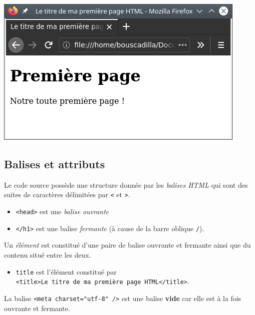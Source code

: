 \documentclass[a4paper,17pt]{extarticle}
\makeatletter
\let\origfigure\figure
\let\endorigfigure\endfigure
\renewenvironment{figure}[1][2] {
    \expandafter\origfigure\expandafter[H]
} {
    \endorigfigure
}
\def\maxwidth{\ifdim\Gin@nat@width>\linewidth\linewidth
    \else\Gin@nat@width\fi}
\let\Oldincludegraphics\includegraphics
\renewcommand{\includegraphics}[1]{\Oldincludegraphics[width=.8\maxwidth]{#1}}
\providecommand{\tightlist}{%
      \setlength{\itemsep}{0pt}\setlength{\parskip}{0pt}}
\makeatother
\begin{document}
\begin{reponse}
\begin{figure}
\centering
\includegraphics{res/premier_exemple.png}
\caption{Capture d'écran du premier exemple}
\end{figure}

            \end{reponse}
    \hypertarget{balises-et-attributs}{%
\subsection{Balises et attributs}\label{balises-et-attributs}}

    Le code source possède une structure donnée par les \emph{balises HTML}
qui sont des suites de caractères délimitées par \texttt{\textless{}} et
\texttt{\textgreater{}}.
\begin{exemple}
    \begin{itemize}
\tightlist
\item
  \texttt{\textless{}head\textgreater{}} est une \emph{balise ouvrante}
\item
  \texttt{\textless{}/h1\textgreater{}} est une balise \emph{fermante}
  (à cause de la barre oblique \texttt{/}).
\end{itemize}

            \end{exemple}
    Un \emph{élément} est constitué d'une paire de balise ouvrante et
fermante ainsi que du contenu situé entre les deux.
\begin{exemple}
    \begin{itemize}
\tightlist
\item
  \texttt{title} est l'élément constitué par
  \texttt{\textless{}title\textgreater{}Le\ titre\ de\ ma\ première\ page\ HTML\textless{}/title\textgreater{}}.
\end{itemize}

            \end{exemple}
    La balise \texttt{\textless{}meta\ charset="utf-8"\ /\textgreater{}} est
une balise \textbf{vide} car elle est à la fois ouvrante et fermante.
\end{document}
